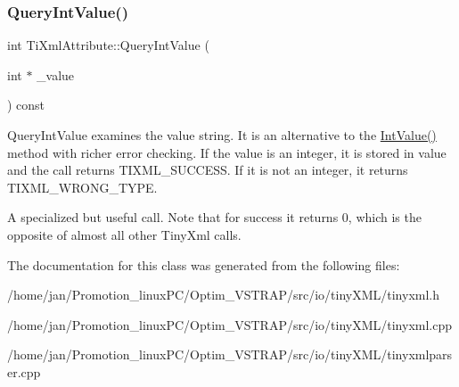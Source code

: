 \subsubsection{\texorpdfstring{Query\+Int\+Value()}{QueryIntValue()}}
{\footnotesize\ttfamily int Ti\+Xml\+Attribute\+::\+Query\+Int\+Value (\begin{DoxyParamCaption}\item[{int $\ast$}]{\+\_\+value }\end{DoxyParamCaption}) const}

Query\+Int\+Value examines the value string. It is an alternative to the \hyperlink{classTiXmlAttribute_ac8501370b065df31a35003c81d87cef2}{Int\+Value()} method with richer error checking. If the value is an integer, it is stored in \textquotesingle{}value\textquotesingle{} and the call returns T\+I\+X\+M\+L\+\_\+\+S\+U\+C\+C\+E\+SS. If it is not an integer, it returns T\+I\+X\+M\+L\+\_\+\+W\+R\+O\+N\+G\+\_\+\+T\+Y\+PE.

A specialized but useful call. Note that for success it returns 0, which is the opposite of almost all other Tiny\+Xml calls. 

The documentation for this class was generated from the following files\+:\begin{DoxyCompactItemize}
\item 
/home/jan/\+Promotion\+\_\+linux\+P\+C/\+Optim\+\_\+\+V\+S\+T\+R\+A\+P/src/io/tiny\+X\+M\+L/tinyxml.\+h\item 
/home/jan/\+Promotion\+\_\+linux\+P\+C/\+Optim\+\_\+\+V\+S\+T\+R\+A\+P/src/io/tiny\+X\+M\+L/tinyxml.\+cpp\item 
/home/jan/\+Promotion\+\_\+linux\+P\+C/\+Optim\+\_\+\+V\+S\+T\+R\+A\+P/src/io/tiny\+X\+M\+L/tinyxmlparser.\+cpp\end{DoxyCompactItemize}
